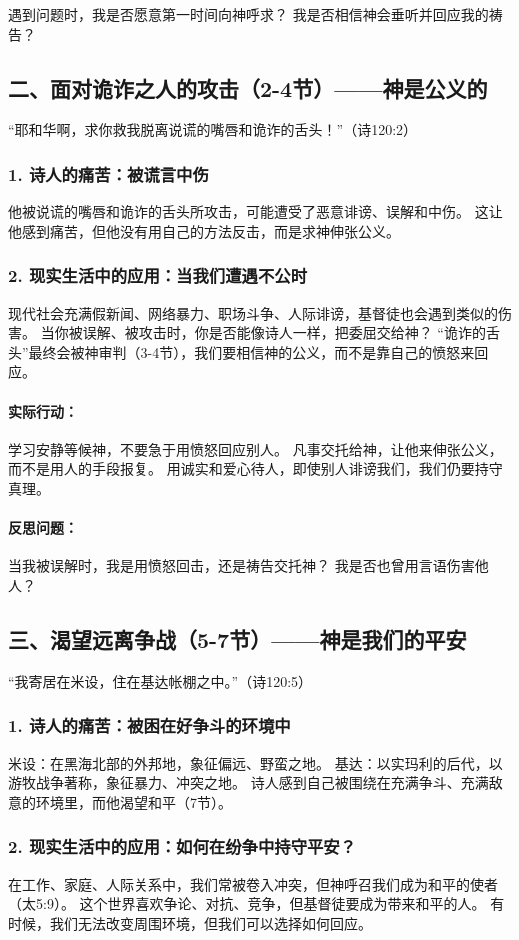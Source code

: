 \documentclass[a4paper, 12pt]{article}
\begin{document}
遇到问题时，我是否愿意第一时间向神呼求？
我是否相信神会垂听并回应我的祷告？
\subsection*{二、面对诡诈之人的攻击（2-4节）——神是公义的}
“耶和华啊，求你救我脱离说谎的嘴唇和诡诈的舌头！”（诗120:2）

\subsubsection*{1. 诗人的痛苦：被谎言中伤}
他被说谎的嘴唇和诡诈的舌头所攻击，可能遭受了恶意诽谤、误解和中伤。
这让他感到痛苦，但他没有用自己的方法反击，而是求神伸张公义。
\subsubsection*{2. 现实生活中的应用：当我们遭遇不公时}
现代社会充满假新闻、网络暴力、职场斗争、人际诽谤，基督徒也会遇到类似的伤害。
当你被误解、被攻击时，你是否能像诗人一样，把委屈交给神？
“诡诈的舌头”最终会被神审判（3-4节），我们要相信神的公义，而不是靠自己的愤怒来回应。
\paragraph*{实际行动：}

学习安静等候神，不要急于用愤怒回应别人。
凡事交托给神，让他来伸张公义，而不是用人的手段报复。
用诚实和爱心待人，即使别人诽谤我们，我们仍要持守真理。
\paragraph*{反思问题：}

当我被误解时，我是用愤怒回击，还是祷告交托神？
我是否也曾用言语伤害他人？
\subsection*{三、渴望远离争战（5-7节）——神是我们的平安}
“我寄居在米设，住在基达帐棚之中。”（诗120:5）

\subsubsection*{1. 诗人的痛苦：被困在好争斗的环境中}
米设：在黑海北部的外邦地，象征偏远、野蛮之地。
基达：以实玛利的后代，以游牧战争著称，象征暴力、冲突之地。
诗人感到自己被围绕在充满争斗、充满敌意的环境里，而他渴望和平（7节）。
\subsubsection*{2. 现实生活中的应用：如何在纷争中持守平安？}
在工作、家庭、人际关系中，我们常被卷入冲突，但神呼召我们成为和平的使者（太5:9）。
这个世界喜欢争论、对抗、竞争，但基督徒要成为带来和平的人。
有时候，我们无法改变周围环境，但我们可以选择如何回应。
\end{document}
